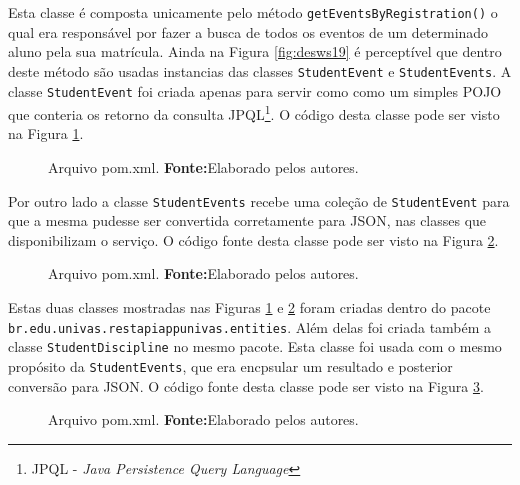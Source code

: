 	\pagebreak
	
	\par Esta classe é composta unicamente pelo método
\texttt{getEventsByRegistration()} o qual era responsável por fazer a busca de
todos os eventos de um determinado aluno pela sua matrícula. Ainda na Figura
\ref{fig:desws19} é perceptível que dentro deste método são usadas instancias
das classes \texttt{StudentEvent} e \texttt{StudentEvents}. A classe
\texttt{StudentEvent} foi criada apenas para servir como como um simples POJO
que conteria os retorno da consulta JPQL\footnote{JPQL - \textit{Java
Persistence Query Language}}. O código desta classe pode ser visto na Figura
\ref{fig:desws20}.
	
	\begin{figure}[h!]
		
		\caption[Arquivo \texttt{pom.xml}]{Arquivo pom.xml.
		\textbf{Fonte:}Elaborado pelos autores.}
		\label{fig:desws20}
	\end{figure}

	\pagebreak

	\par Por outro lado a classe \texttt{StudentEvents} recebe uma coleção de
\texttt{StudentEvent} para que a mesma pudesse ser convertida corretamente para
JSON, nas classes que disponibilizam o serviço. O código fonte desta classe pode
ser visto na Figura \ref{fig:desws21}.
	
	\begin{figure}[h!]
		
		\caption[Arquivo \texttt{pom.xml}]{Arquivo pom.xml.
		\textbf{Fonte:}Elaborado pelos autores.}
		\label{fig:desws21}
	\end{figure}
	
	\par Estas duas classes mostradas nas Figuras \ref{fig:desws20} e 
\ref{fig:desws21} foram criadas dentro do pacote\\ 
\texttt{br.edu.univas.restapiappunivas.entities}. Além delas foi criada também
a classe \texttt{StudentDiscipline} no mesmo pacote. Esta classe foi usada com o
mesmo propósito da \texttt{StudentEvents}, que era encpsular um resultado e
posterior conversão para JSON. O código fonte desta classe pode ser visto na
Figura \ref{fig:desws22}.

	\begin{figure}[h!]
		
		\caption[Arquivo \texttt{pom.xml}]{Arquivo pom.xml.
		\textbf{Fonte:}Elaborado pelos autores.}
		\label{fig:desws22}
	\end{figure}
	
